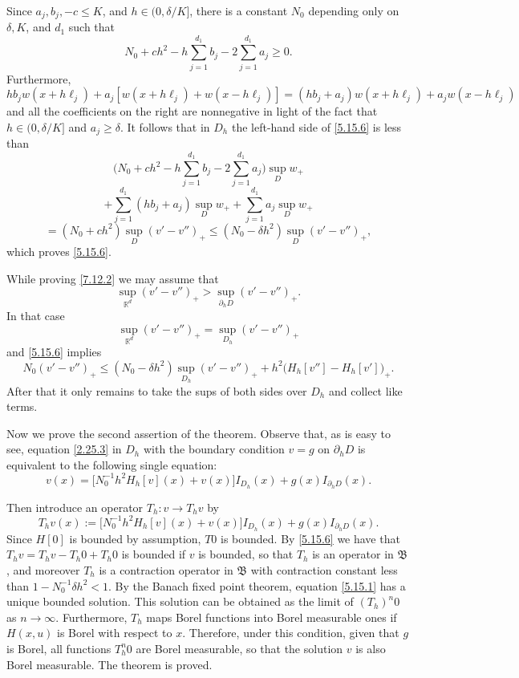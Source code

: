 \documentclass[11pt, reqno]{amsart}
\theoremstyle{definition}
\theoremstyle{remark}
\begin{document}
Since $a_{j},b_{j},-c\leq K $, and $h\in(0,\delta/K]$, 
there is a constant $N_{0}$  depending only on
$\delta,K$, and $d_{1}$ such that
$$
N_{0}+ch^{2}-h \sum_{j=1}^{d_{1}}b_{j}-2 \sum_{j=1}^{d_{1}}a_{j}\geq0.
$$
Furthermore, 
$$
h b_{j} w(x+h\ell_{j}) + 
a_{j} [w(x+h\ell_{j})  +
w(x-h\ell_{j})]= (hb_{j}+a_{j})w (x+h\ell_{j})
+  a_{j} w(x-h\ell_{j})
$$
and all the coefficients on the right are nonnegative
in light of the fact that
 $h\in(0,\delta/K]$ and $a_{j}\geq\delta$. It follows that
in $D_{h}$
the left-hand side of \eqref{5.15.6} is less than
$$
 \big(N_{0}+ch^{2}-h \sum_{j=1}^{d_{1}}b_{j}-2 \sum_{j=1}^{d_{1}}a_{j}
\big)\sup_{D} w_{+}
$$
$$
+\sum_{j=1}^{d_{1}}(hb_{j}+a_{j}) \sup_{D}w_{+}
 + \sum_{j=1}^{d_{1}} a_{j}  \sup_{D}w_{+}
$$
$$
 =(N_{0}+ch^{2})
\sup_{D}(v'-v'')_{+}\leq
(N_{0}- \delta  h^{2} )
\sup_{D}(v'-v'')_{+},
$$
which proves \eqref{5.15.6}. 

While proving \eqref{7.12.2} we may assume that
$$
\sup_{{\mathbb{R}}^{d}}(v'-v'')_{+}>\sup_{\partial_{h}D}(v'-v'')_{+}.
$$
In that case 
$$
\sup_{{\mathbb{R}}^{d}}(v'-v'')_{+}=\sup_{D_{h}}(v'-v'')_{+}
$$
and \eqref{5.15.6} implies
$$
N_{0}(v' -v'' )_{+}
\leq
(N_{0}- \delta  h^{2} )
\sup_{D_{h}}(v'-v'')_{+}+
h^{2}\big(H_{h}[v''] -H_{h}[v'] \big)_{+}.
$$
After that
it only remains to take the sups of both sides over $D_{h}$
and collect like terms.
 
Now we prove the second assertion of  the theorem.
Observe that, as is easy to see, equation
\eqref{2.25.3} in $D_{h}$
with the boundary condition $v=g$ on $\partial_{h}D$
 is equivalent to the following single
equation:
\begin{equation}
                                                       \label{5.15.1}
v(x)=\big[N_{0}^{-1}h^{2}
H_{h}[v]( x)
+v(x)\big]I_{D_{h}}(x)+g(x)I_{\partial_{h}D}(x).
\end{equation}

Then   introduce an operator 
$T_{h}:v\to T_{h}v$
  by
$$
T_{h}v(x):=\big[N_{0}^{-1}h^{2}H_{h}[v]( x)
+v(x)\big]I_{D_{h}}(x)+g(x)I_{\partial_{h}D}(x).
$$
Since $H[0]$ is bounded by assumption, $T0$
is bounded.
By \eqref{5.15.6}  we have that
$T_{h}v=T_{h}v-T_{h} 0  +T_{h} 0 $ is bounded if
$v$ is bounded, so that $T_{h}$ is an operator in ${\mathfrak{B}}$,
and moreover $T_{h} $
is a contraction operator 
in ${\mathfrak{B}}$   with contraction
constant   less than $1-N_{0}^{-1} \delta h^{2} 
<1$. By the Banach fixed point theorem, 
equation \eqref{5.15.1} has a unique bounded solution.
This solution can be obtained as the limit of $(T_{h})^{n}0$
as $n\to\infty$. Furthermore, $T_{h}$ maps Borel functions
into Borel measurable ones if $H( x,u)$ is Borel with respect to $x$.
Therefore, under this condition, given that $g$ is Borel,
all functions 
$ T_{h} ^{n}0$ are Borel measurable, so that the solution
$v$ is also Borel measurable.
The theorem is proved.
\end{document}
